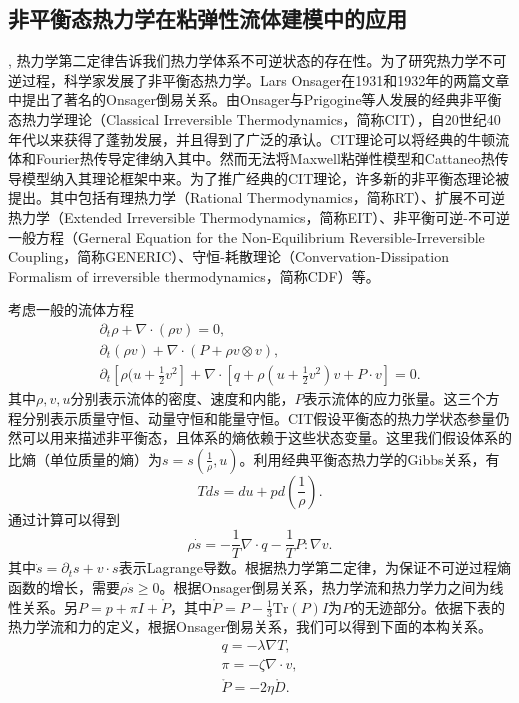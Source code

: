\documentclass{article}
\begin{document}
\subsection{非平衡态热力学在粘弹性流体建模中的应用},
热力学第二定律告诉我们热力学体系不可逆状态的存在性。为了研究热力学不可逆过程，科学家发展了非平衡态热力学。Lars Onsager在1931和1932年的两篇文章中提出了著名的Onsager倒易关系\cite{onsager1931reciprocal,onsager1931reciprocalII}。由Onsager与Prigogine等人发展的经典非平衡态热力学理论（Classical Irreversible Thermodynamics，简称CIT），自20世纪40年代以来获得了蓬勃发展，并且得到了广泛的承认\cite{jou1996extended,truesdell2012rational}。CIT理论可以将经典的牛顿流体和Fourier热传导定律纳入其中。然而无法将Maxwell粘弹性模型和Cattaneo热传导模型纳入其理论框架中来。为了推广经典的CIT理论，许多新的非平衡态理论被提出。其中包括有理热力学（Rational Thermodynamics，简称RT）、扩展不可逆热力学（Extended Irreversible Thermodynamics，简称EIT）、非平衡可逆-不可逆一般方程（Gerneral Equation for the Non-Equilibrium Reversible-Irreversible Coupling，简称GENERIC）、守恒-耗散理论（Convervation-Dissipation Formalism of irreversible thermodynamics，简称CDF）等\cite{truesdell2012rational,jou1996extended,ottinger2005beyond,zhu2014conservation}。

考虑一般的流体方程
\begin{subequations} \label{eq:fluid}
	\begin{align}
		\partial_t \rho + \nabla \cdot (\rho v) = 0 ,\\
		\partial_t (\rho v) + \nabla \cdot (P + \rho v \otimes v), \\
		\partial_t[\rho (u + \frac{1}{2} v^2] + \nabla \cdot [q + \rho (u+\frac{1}{2}v^2) v + P \cdot v] = 0.
	\end{align}
\end{subequations}
其中$\rho,v,u$分别表示流体的密度、速度和内能，$P$表示流体的应力张量。这三个方程分别表示质量守恒、动量守恒和能量守恒。CIT假设平衡态的热力学状态参量仍然可以用来描述非平衡态，且体系的熵依赖于这些状态变量。这里我们假设体系的比熵（单位质量的熵）为$s=s(\frac{1}{\rho},u)$。利用经典平衡态热力学的Gibbs关系，有
\begin{equation*}
	T ds = du + p d(\frac{1}{\rho}).
\end{equation*}
通过计算可以得到
\begin{equation*}
	\rho \dot{s} = - \frac{1}{T} \nabla \cdot q - \frac{1}{T} P: \nabla v.
\end{equation*}
其中$\dot{s} = \partial_t s + v \cdot s$表示Lagrange导数。根据热力学第二定律，为保证不可逆过程熵函数的增长，需要$\rho \dot{s} \ge 0 $。根据Onsager倒易关系，热力学流和热力学力之间为线性关系。另$P = p + \pi I + \mathring{P}$，其中$\mathring{P} = P - \frac{1}{3} \mbox{Tr}(P) I$为$P$的无迹部分。依据下表的热力学流和力的定义，根据Onsager倒易关系，我们可以得到下面的本构关系。
\begin{eqnarray*}
	q = -\lambda \nabla T, \\
	\pi =  - \zeta \nabla \cdot v, \\
	\mathring{P} = - 2 \eta \mathring{D}.
\end{eqnarray*}
\end{document}
